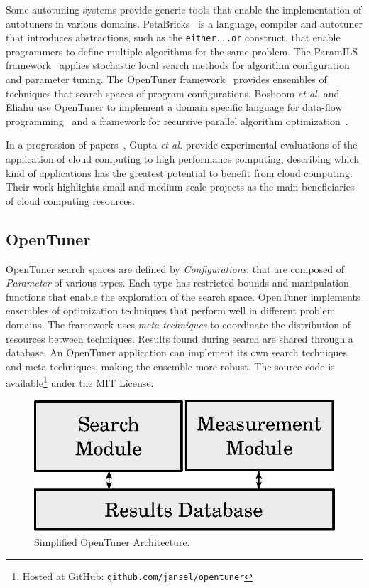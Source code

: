 \documentclass[a4paper, 12pt]{article}
\begin{document}
Some autotuning systems provide generic tools that enable the implementation of
autotuners in various domains. PetaBricks~\cite{ansel2009petabricks} is a
language, compiler and autotuner that introduces abstractions, such as the
\texttt{\footnotesize either...or} construct, that enable programmers to define
multiple algorithms for the same problem.  The ParamILS
framework~\cite{hutter2009paramils} applies stochastic local search methods
for algorithm configuration and parameter tuning.  The OpenTuner
framework~\cite{ansel2014opentuner} provides ensembles of techniques that
search spaces of program configurations. Bosboom \emph{et al.} and Eliahu use
OpenTuner to implement a domain specific language for data-flow
programming~\cite{bosboom2014streamjit} and a framework for recursive parallel
algorithm optimization~\cite{eliahu2015frpa}.

In a progression of papers~\cite{gupta2012exploring,gupta2014evaluating,gupta2013hpccloud},
Gupta \emph{et al.} provide experimental evaluations of the application of
cloud computing to high performance computing, describing which kind of
applications has the greatest potential to benefit from cloud computing.
Their work highlights small and medium scale projects as the main beneficiaries
of cloud computing resources.

\subsection{OpenTuner} \label{sec:opt}

OpenTuner search spaces are defined by \emph{Configurations}, that are composed
of \emph{Parameter} of various types. Each type has restricted bounds and
manipulation functions that enable the exploration of the search space.
OpenTuner implements ensembles of optimization techniques that
perform well in different problem domains. The framework uses
\emph{meta-techniques} to coordinate the distribution of resources
between techniques.
Results found during search are shared through a
database. An OpenTuner application can implement its own search
techniques and meta-techniques, making the ensemble more robust.
The source code is available\footnote{Hosted at GitHub:
\texttt{\scriptsize github.com/jansel/opentuner}} under the MIT License.


\begin{figure}[htpb]
    \centering
    \includegraphics[scale=.62]{opentuner-implementation}
    \caption{Simplified OpenTuner Architecture.}
    \label{fig:ot-imp}
\end{figure}
\end{document}
